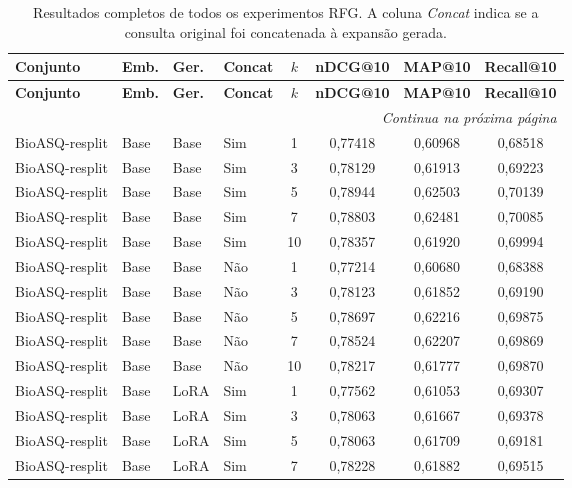 \begin{longtable}{llllcccc}
\caption{Resultados completos de todos os experimentos RFG. A coluna \textit{Concat} indica se a consulta original foi concatenada à expansão gerada.}
\label{tab:apendice_rfg_completo}\\
\hline
\textbf{Conjunto} & \textbf{Emb.} & \textbf{Ger.} & \textbf{Concat} & \textbf{$k$} & \textbf{nDCG@10} & \textbf{MAP@10} & \textbf{Recall@10} \\ \hline
\endfirsthead
\hline
\textbf{Conjunto} & \textbf{Emb.} & \textbf{Ger.} & \textbf{Concat} & \textbf{$k$} & \textbf{nDCG@10} & \textbf{MAP@10} & \textbf{Recall@10} \\ \hline
\endhead
\hline \multicolumn{8}{r}{\textit{Continua na próxima página}} \\
\endfoot
\hline
\endlastfoot
BioASQ-resplit & Base & Base & Sim & 1 & 0,77418 & 0,60968 & 0,68518 \\
BioASQ-resplit & Base & Base & Sim & 3 & 0,78129 & 0,61913 & 0,69223 \\
BioASQ-resplit & Base & Base & Sim & 5 & 0,78944 & 0,62503 & 0,70139 \\
BioASQ-resplit & Base & Base & Sim & 7 & 0,78803 & 0,62481 & 0,70085 \\
BioASQ-resplit & Base & Base & Sim & 10 & 0,78357 & 0,61920 & 0,69994 \\
BioASQ-resplit & Base & Base & Não & 1 & 0,77214 & 0,60680 & 0,68388 \\
BioASQ-resplit & Base & Base & Não & 3 & 0,78123 & 0,61852 & 0,69190 \\
BioASQ-resplit & Base & Base & Não & 5 & 0,78697 & 0,62216 & 0,69875 \\
BioASQ-resplit & Base & Base & Não & 7 & 0,78524 & 0,62207 & 0,69869 \\
BioASQ-resplit & Base & Base & Não & 10 & 0,78217 & 0,61777 & 0,69870 \\
BioASQ-resplit & Base & LoRA & Sim & 1 & 0,77562 & 0,61053 & 0,69307 \\
BioASQ-resplit & Base & LoRA & Sim & 3 & 0,78063 & 0,61667 & 0,69378 \\
BioASQ-resplit & Base & LoRA & Sim & 5 & 0,78063 & 0,61709 & 0,69181 \\
BioASQ-resplit & Base & LoRA & Sim & 7 & 0,78228 & 0,61882 & 0,69515 \\

\end{longtable}

